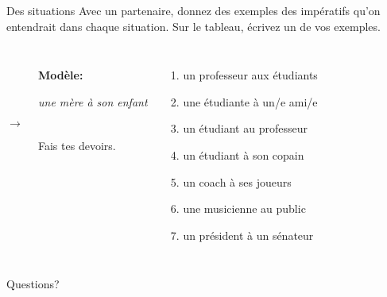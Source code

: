 \documentclass{beamer}
\begin{document}
  \begin{frame}{Des situations }
    Avec un partenaire, donnez des exemples des impératifs qu'on entendrait dans chaque situation.
    Sur le tableau, écrivez un de vos exemples. \\
    \begin{columns}
        \begin{description}
          \item[] \textbf{Modèle:}
          \item[] \emph{une mère à son enfant}
          \item[$\to$] Fais tes devoirs.
          \item[] 
        \end{description}
        \begin{enumerate}
          \item un professeur aux étudiants
          \item une étudiante à un/e ami/e
          \item un étudiant au professeur
          \item un étudiant à son copain
          \item un coach à ses joueurs
          \item une musicienne au public
          \item un président à un sénateur
        \end{enumerate}
    \end{columns}
  \end{frame}

  \begin{frame}{}
    \begin{center}
      \Large Questions?
    \end{center}
  \end{frame}
\end{document}
